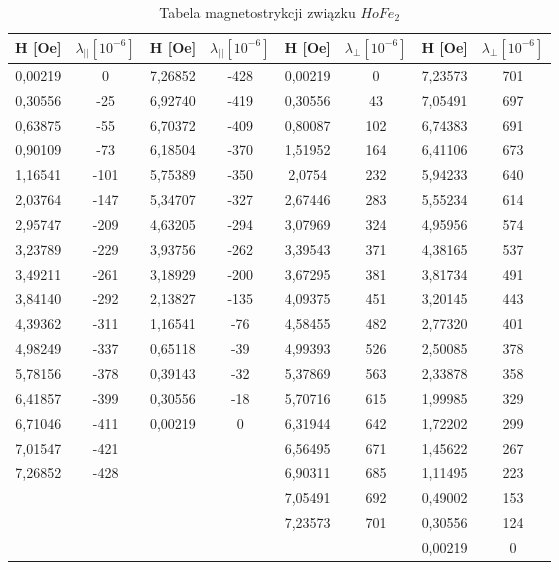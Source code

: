 \documentclass[a4paper,12pt]{article}
\numberwithin{equation}{section}
\begin{document}
\begin{appendices}


  \label{HoMagnetoTab}
  \scriptsize
  \begin{longtable}[c]{|c|c|c|c|c|c|c|c|}
\caption{Tabela magnetostrykcji związku $HoFe_2$}\\
\hline
H [Oe]	&	$\lambda_{||} [10^{-6}]	$ 	&	H [Oe]	&	$\lambda_{||}  [10^{-6}]	$	&	H [Oe]	&	$\lambda_{\perp}  [10^{-6}]$		&	H [Oe]	&	$\lambda_{\perp} [10^{-6}]$	\\\hline\hline
0,00219	&	0	&	7,26852	&	-428	&	0,00219	&	0	&	7,23573	&	701	\\\hline
0,30556	&	-25	&	6,92740	&	-419	&	0,30556	&	43	&	7,05491	&	697	\\\hline
0,63875	&	-55	&	6,70372	&	-409	&	0,80087	&	102	&	6,74383	&	691	\\\hline
0,90109	&	-73	&	6,18504	&	-370	&	1,51952	&	164	&	6,41106	&	673	\\\hline
1,16541	&	-101	&	5,75389	&	-350	&	2,0754	&	232	&	5,94233	&	640	\\\hline
2,03764	&	-147	&	5,34707	&	-327	&	2,67446	&	283	&	5,55234	&	614	\\\hline
2,95747	&	-209	&	4,63205	&	-294	&	3,07969	&	324	&	4,95956	&	574	\\\hline
3,23789	&	-229	&	3,93756	&	-262	&	3,39543	&	371	&	4,38165	&	537	\\\hline
3,49211	&	-261	&	3,18929	&	-200	&	3,67295	&	381	&	3,81734	&	491	\\\hline
3,84140	&	-292	&	2,13827	&	-135	&	4,09375	&	451	&	3,20145	&	443	\\\hline
4,39362	&	-311	&	1,16541	&	-76	&	4,58455	&	482	&	2,77320	&	401	\\\hline
4,98249	&	-337	&	0,65118	&	-39	&	4,99393	&	526	&	2,50085	&	378	\\\hline
5,78156	&	-378	&	0,39143	&	-32	&	5,37869	&	563	&	2,33878	&	358	\\\hline
6,41857	&	-399	&	0,30556	&	-18	&	5,70716	&	615	&	1,99985	&	329	\\\hline
6,71046	&	-411	&	0,00219	&	0	&	6,31944	&	642	&	1,72202	&	299	\\\hline
7,01547	&	-421	&		 \multicolumn{2}{c|}{}		&	6,56495	&	671	&	1,45622	&	267	\\\cline{1-2}\cline{5-8}
7,26852	&	-428	&		 \multicolumn{2}{c|}{}		&	6,90311	&	685	&	1,11495	&	223	\\\cline{1-2}\cline{5-8}
 \multicolumn{4}{c|}{}	&	7,05491	&	692	&	0,49002	&	153	\\\cline{5-8}
 \multicolumn{4}{c|}{}	&	7,23573	&	701	&	0,30556	&	124	\\\cline{5-8}
 \multicolumn{6}{c|}{}	&	0,00219	&	0	\\\cline{7-8}
\end{longtable}



\end{appendices}
\end{document}
